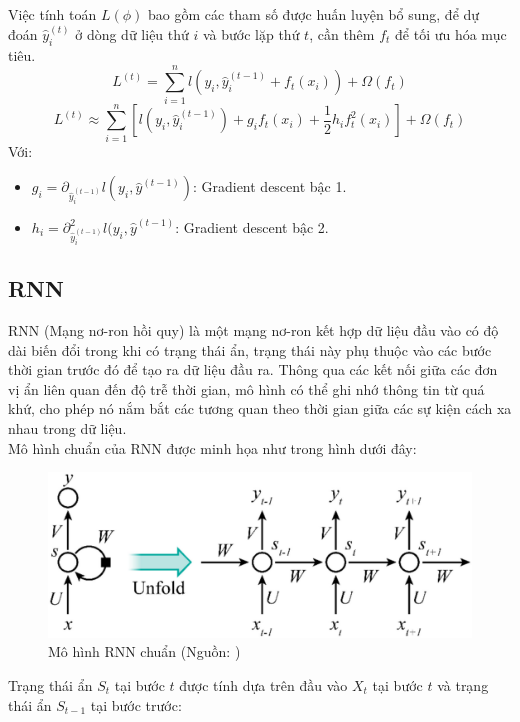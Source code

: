 \documentclass[conference]{IEEEtran}
\begin{document}
Việc tính toán \(L(\phi)\) bao gồm các tham số được huấn luyện bổ sung, để dự đoán \( \hat{y}_i^{(t)} \) ở dòng dữ liệu thứ \( i \) và bước lặp thứ \( t \), cần thêm \( f_t \) để tối ưu hóa mục tiêu.
\[
L^{(t)} = \sum_{i=1}^{n} l(y_i, \hat{y}_i^{(t-1)} + f_t(x_i)) + \Omega(f_t)
\]
\[
L^{(t)} \approx \sum_{i=1}^{n} \left[ l(y_i, \hat{y}_i^{(t-1)}) + g_i f_t(x_i) + \frac{1}{2} h_i f_t^2(x_i) \right] + \Omega(f_t)
\]
Với:
\begin{itemize}
    \item \(g_i = \partial_{\hat{y}_i^{(t-1)}} l(y_i, \hat{y}^{(t-1)})\): Gradient descent bậc 1.
    \item \( h_i = \partial^2_{\hat{y}_i^{(t-1)}} l(y_i, \hat{y}^{(t-1)} \): Gradient descent bậc 2.
\end{itemize}


\subsection{RNN}
RNN (Mạng nơ-ron hồi quy) là một mạng nơ-ron kết hợp dữ liệu đầu vào có độ dài biến đổi trong khi có trạng thái ẩn, trạng thái này phụ thuộc vào các bước thời gian trước đó để tạo ra dữ liệu đầu ra. Thông qua các kết nối giữa các đơn vị ẩn liên quan đến độ trễ thời gian, mô hình có thể ghi nhớ thông tin từ quá khứ, cho phép nó nắm bắt các tương quan theo thời gian giữa các sự kiện cách xa nhau trong dữ liệu.\cite{RNN}\\
Mô hình chuẩn của RNN được minh họa như trong hình dưới đây:
\begin{figure}[H]
    \centering
    \begin{minipage}{0.8\linewidth}
    \centering
        \vspace{0pt}
        \includegraphics[width=0.8\linewidth]{images/RNN.png}
        \vspace{0pt}
    \caption{Mô hình RNN chuẩn (Nguồn: \cite{DeepLearning})}
    \label{fig7}
    \end{minipage}
\end{figure}
Trạng thái ẩn \( S_t \) tại bước \( t \) được tính dựa trên đầu vào  \( X_t \) tại bước \( t \) và trạng thái ẩn \( S_{t-1} \) tại bước trước:
\end{document}
